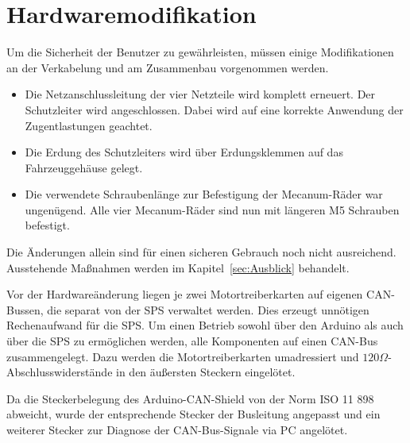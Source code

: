 
\section{Hardwaremodifikation}
\label{sec:Hardwaremodifikation}
Um die Sicherheit der Benutzer zu gewährleisten, müssen einige Modifikationen an der Verkabelung und am Zusammenbau vorgenommen werden.

\begin{itemize}
    \item{Die Netzanschlussleitung der vier Netzteile wird komplett erneuert. Der Schutzleiter wird angeschlossen. Dabei wird auf eine korrekte Anwendung der Zugentlastungen geachtet.}
    \item{Die Erdung des Schutzleiters wird über Erdungsklemmen auf das Fahrzeuggehäuse gelegt.}
    \item{Die verwendete Schraubenlänge zur Befestigung der Mecanum-Räder war ungenügend. Alle vier Mecanum-Räder sind nun mit längeren M5 Schrauben befestigt.}
\end{itemize}

Die Änderungen allein sind für einen sicheren Gebrauch noch nicht ausreichend. Ausstehende Maßnahmen werden im Kapitel~\ref{sec:Ausblick} behandelt.

Vor der Hardwareänderung liegen je zwei Motortreiberkarten auf eigenen CAN-Bussen, die separat von der SPS verwaltet werden. Dies erzeugt unnötigen Rechenaufwand für die SPS.
Um einen Betrieb sowohl über den Arduino als auch über die SPS zu ermöglichen werden, alle Komponenten auf einen CAN-Bus zusammengelegt. Dazu werden die Motortreiberkarten umadressiert und  $120 \Omega$-Abschlusswiderstände in den äußersten Steckern eingelötet.

Da die Steckerbelegung des Arduino-CAN-Shield von der Norm ISO 11 898 abweicht, wurde der entsprechende Stecker der Busleitung angepasst und ein weiterer Stecker zur Diagnose der CAN-Bus-Signale via PC angelötet.

